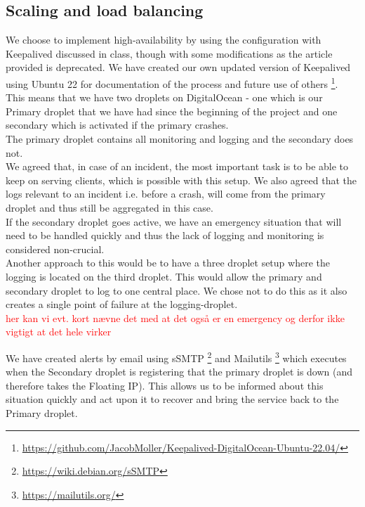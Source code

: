 \subsection{Scaling and load balancing}
We choose to implement high-availability by using the configuration with Keepalived discussed in class, though with some modifications as the article\cite{KeepalivedUbuntu14} provided is deprecated. We have created our own updated version of Keepalived using Ubuntu 22 for documentation of the process and future use of others \footnote{\url{https://github.com/JacobMoller/Keepalived-DigitalOcean-Ubuntu-22.04/}}. \\
This means that we have two droplets on DigitalOcean - one which is our Primary droplet that we have had since the beginning of the project and one secondary which is activated if the primary crashes. \\
The primary droplet contains all monitoring and logging and the secondary does not. \\
We agreed that, in case of an incident, the most important task is to be able to keep on serving clients, which is possible with this setup. We also agreed that the logs relevant to an incident i.e. before a crash, will come from the primary droplet and thus still be aggregated in this case.\\ If the secondary droplet goes active, we have an emergency situation that will need to be handled quickly and thus the lack of logging and monitoring is considered non-crucial. \\

Another approach to this would be to have a three droplet setup where the logging is located on the third droplet. This would allow the primary and secondary droplet to log to one central place. We chose not to do this as it also creates a single point of failure at the logging-droplet.\\
\textcolor{red}{her kan vi evt. kort nævne det med at det også er en emergency og derfor ikke vigtigt at det hele virker}

We have created alerts by email using sSMTP \footnote{\url{https://wiki.debian.org/sSMTP}} and Mailutils \footnote{\url{https://mailutils.org/}} which executes when the Secondary droplet is registering that the primary droplet is down (and therefore takes the Floating IP). This allows us to be informed about this situation quickly and act upon it to recover and bring the service back to the Primary droplet.




